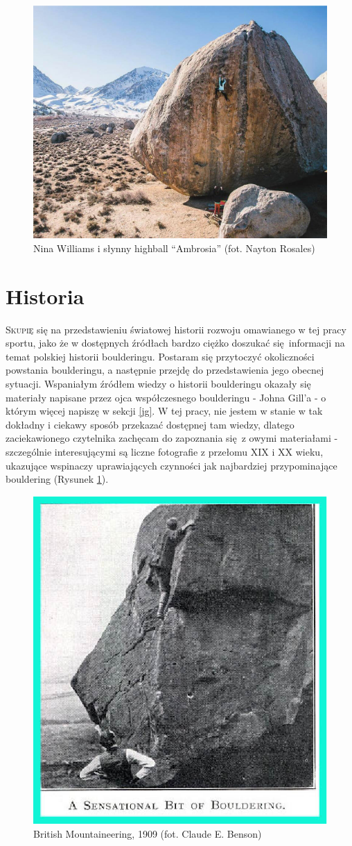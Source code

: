 \documentclass{article}
\begin{document}
\begin{figure}[!htbp]
	\begin{center}
		\includegraphics[width=0.7\linewidth]{images/nina-williams-abrosia.eps}
	\end{center}
	\caption{Nina Williams i słynny highball “Ambrosia” (fot. Nayton Rosales) \cite{nina}}
\end{figure}

\section{Historia}
\lettrine[lines=2]{S}{kupię} się na przedstawieniu światowej historii rozwoju omawianego w tej pracy sportu, jako że w dostępnych źródłach bardzo ciężko doszukać się informacji na temat polskiej historii boulderingu. Postaram się przytoczyć okoliczności powstania boulderingu, a następnie przejdę do przedstawienia jego obecnej sytuacji. Wspaniałym źródłem wiedzy o historii boulderingu okazały się materiały \cite{gill-history} napisane przez ojca współczesnego boulderingu - Johna Gill'a - o którym więcej napiszę w sekcji \ref{jg}. W tej pracy, nie jestem w stanie w tak dokładny i ciekawy sposób przekazać dostępnej tam wiedzy, dlatego zaciekawionego czytelnika zachęcam do zapoznania się z owymi materiałami - szczególnie interesującymi są liczne fotografie z przełomu XIX i XX wieku, ukazujące wspinaczy uprawiających czynności jak najbardziej przypominające bouldering (Rysunek \ref{benson}).

\begin{figure}[!htbp]
	\begin{center}
		\includegraphics[width=0.5\linewidth]{images/old1.eps}
	\end{center}
	\caption{British Mountaineering, 1909 (fot. Claude E. Benson) \cite{gill-history}}
	\label{benson}
\end{figure}
\end{document}
